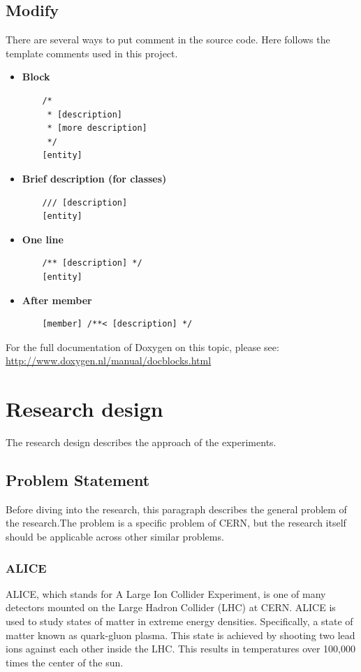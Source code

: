 \documentclass[]{article}
\begin{document}
\subsection{Modify}
There are several ways to put comment in the source code. Here follows the template comments used in this project.
\begin{itemize}
\item \textbf{Block}
\begin{verbatim}
	/*
	 * [description]
	 * [more description]
	 */
	[entity]
\end{verbatim}

\item \textbf{Brief description (for classes)}
\begin{verbatim}
	/// [description]
	[entity]
\end{verbatim}

\item \textbf{One line}
\begin{verbatim}
	/** [description] */
	[entity]
\end{verbatim}

\item \textbf{After member}
\begin{verbatim}
	[member] /**< [description] */
\end{verbatim}

\end{itemize}

For the full documentation of Doxygen on this topic, please see: \url{http://www.doxygen.nl/manual/docblocks.html}


\section{Research design}
The research design describes the approach of the experiments.


\subsection{Problem Statement}
Before diving into the research, this paragraph describes the general problem of the research.The problem is a specific problem of CERN, but the research itself should be applicable across other similar problems.


\subsubsection{ALICE}
ALICE, which stands for A Large Ion Collider Experiment, is one of many detectors mounted on the Large Hadron Collider (LHC) at CERN. ALICE is used to study states of matter in extreme energy densities. Specifically, a state of matter known as quark-gluon plasma. This state is achieved by shooting two lead ions against each other inside the LHC. This results in temperatures over 100,000 times the center of the sun.
\end{document}
